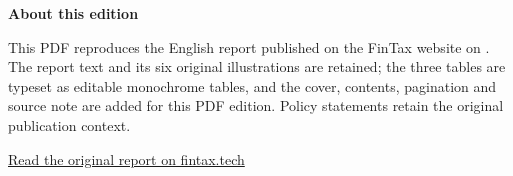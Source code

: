 \documentclass[11pt,a4paper]{article}
\begin{document}
\hypersetup{pageanchor=false}

\hypersetup{pageanchor=true}
\tableofcontents
\vfill
\noindent\textbf{About this edition}\par
\noindent This PDF reproduces the English report published on the FinTax website on
\ReportDate. The report text and its six original illustrations are retained;
the three tables are typeset as editable monochrome tables, and the cover, contents, pagination and source note are added for this PDF edition.
Policy statements retain the original publication context.\par
\medskip
\noindent\href{\ReportURL}{Read the original report on fintax.tech}
\clearpage
{}






% 
% 
\end{document}
